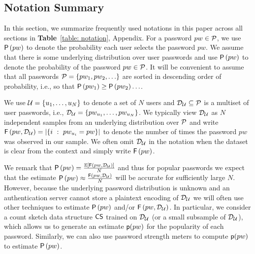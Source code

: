 \vspace*{-\baselineskip}
\subsection{Notation Summary}

In this section, we summarize frequently used notations in this paper across all sections in \textbf{Table}~\ref{table: notation}, Appendix.  For a password $pw \in \mathcal{P}$, we use $\mathsf{P}\left(pw\right)$ to denote the probability each user selects the password $pw$. We assume that there is some underlying distribution over user passwords and use $\mathsf{P}\left(pw\right)$ to denote the probability of the password $pw \in \mathcal{P}$. It will be convenient to assume that all passwords $ \mathcal{P} = \{pw_1,pw_2,\ldots \}$ are sorted in descending order of probability, i.e., so that $\mathsf{P}\left(pw_1\right) \geq \mathsf{P}\left(pw_2\right) \ldots $. %


We use $\mathcal{U} = \{u_1,\ldots,u_N\}$ to denote a set of $N$ users and $\mathcal{D}_{{\mathcal{U}}} \subseteq \mathcal{P}$ is a multiset of user passwords, i.e., $\mathcal{D}_{{\mathcal{U}}} = \{pw_{u_1},\ldots,pw_{u_N}\}$. We typically view $\mathcal{D}_{{\mathcal{U}}}$ as $N$ independent samples from an underlying distribution over $\mathcal{P}$ and write $\mathsf{F}\left(pw, \mathcal{D}_{{\mathcal{U}}} \right)= \left| \left\{ i ~:~pw_{u_i} = pw \right\} \right|$ to denote the number of times the password $pw$ was observed in our sample. We often omit $\mathcal{D}_{{\mathcal{U}}}$ in the notation when the dataset is clear from the context and simply write $\mathsf{F}\left(pw\right)$. 

We remark that $\mathsf{P}\left(pw\right) = \frac{\mathbb{E}\left[ \mathsf{F}\left(pw,  \mathcal{D}_{{\mathcal{U}}}\right)\right]}{N}$ and thus for popular passwords we expect that the estimate $\mathsf{P}\left(pw\right) \approx  \frac{\mathsf{F}\left(pw, \mathcal{D}_{{\mathcal{U}}}\right)}{N}$ will be accurate for sufficiently large $N$. However, because the underlying password distribution is unknown and an authentication server cannot store a plaintext encoding of $\mathcal{D}_{{\mathcal{U}}}$ we will often use other techniques to estimate  $\mathsf{P}\left(pw\right)$ and/or $\mathsf{F}\left(pw, \mathcal{D}_{{\mathcal{U}}}\right)$. In particular, we consider a count sketch data structure $\mathsf{CS}$ trained on $\mathcal{D}_{{\mathcal{U}}}$ (or a small subsample of $\mathcal{D}_{{\mathcal{U}}}$), which allows us to generate an estimate $\textsf{p}(pw)$ for the popularity of each password. Similarly, we can also use password strength meters to compute $\textsf{p}(pw)$ to estimate $\mathsf{P}\left(pw\right)$.



